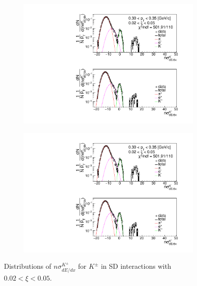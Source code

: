 \begin{figure}[h!]
\begin{subfigure}{.3\textwidth}
		\includegraphics[width=\linewidth, page=6]{chapters/chrgSTAR/img/dEdx/fit2019_thirdStep_1_0.pdf}
	\end{subfigure}
	\begin{subfigure}{.33\textwidth}
		\includegraphics[width=\linewidth, page=7]{chapters/chrgSTAR/img/dEdx/fit2019_thirdStep_1_0.pdf}
	\end{subfigure}
	\caption[Distributions of $n\sigma^{K^\pm}_{dE/dx}$ for $K^\pm$ in SD interactions with $0.02 < \xi<0.5$]{Distributions of $n\sigma^{K^\pm}_{dE/dx}$ for $K^\pm$ in SD interactions with $0.02 < \xi<0.05$.}
	\label{fig:nsigmaKfit_0}
\end{figure}

